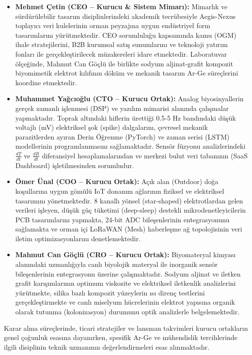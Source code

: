 \documentclass[11pt,a4paper]{article}
\begin{document}
\begin{itemize}[leftmargin=1cm]
  \item \textbf{Mehmet Çetin (CEO -- Kurucu \& Sistem Mimarı):} Mimarlık ve sürdürülebilir tasarım disiplinlerindeki akademik tecrübesiyle Aegis-Nexus toplayıcı veri kulelerinin orman peyzajına uygun endüstriyel form tasarımlarını yürütmektedir. CEO sorumluluğu kapsamında kamu (OGM) ihale stratejilerini, B2B kurumsal satış sunumlarını ve teknoloji yatırım fonları ile gerçekleştirilecek müzakereleri idare etmektedir. Laboratuvar ölçeğinde, Mahmut Can Göçlü ile birlikte sodyum aljinat-grafit kompozit biyomimetik elektrot kılıfının döküm ve mekanik tasarım Ar-Ge süreçlerini koordine etmektedir.
  \item \textbf{Muhammet Yağcıoğlu (CTO -- Kurucu Ortak):} Analog biyosinyallerin gerçek zamanlı işlenmesi (DSP) ve yazılım mimarisi alanında çalışmalar yapmaktadır. Toprak altındaki hiflerin ürettiği 0.5-5 Hz bandındaki düşük voltajlı (mV) elektriksel şok (spike) dalgalarını, çevresel mekanik parazitlerden ayıran Derin Öğrenme (PyTorch) ve zaman serisi (LSTM) modellerinin programlanmasını sağlamaktadır. Sensör füzyonu analizlerindeki $\frac{dT}{dt}$ ve $\frac{dR}{dt}$ diferansiyel hesaplamalarından ve merkezi bulut veri tabanının (SaaS Dashboard) işletilmesinden sorumludur.
  \item \textbf{Ömer Ünal (COO -- Kurucu Ortak):} Açık alan (Outdoor) doğa koşullarına uygun gömülü IoT donanım ağlarının fiziksel ve elektriksel tasarımını yönetmektedir. 8 kanallı yönsel (star-shaped) elektrotlardan gelen verileri işleyen, düşük güç tüketimi (deep-sleep) destekli mikrodenetleyicilerin PCB tasarımlarını yapmakta, 24-bit ADC bileşenlerinin entegrasyonunu sağlamakta ve orman içi LoRaWAN (Mesh) haberleşme ağ topolojisinin veri iletim optimizasyonlarını denetlemektedir.
  \item \textbf{Mahmut Can Göçlü (CRO -- Kurucu Ortak):} Biyomateryal kimyası alanındaki uzmanlığıyla canlı biyolojik materyal ile inorganik sensör bileşenlerinin entegrasyonu üzerine çalışmaktadır. Sodyum aljinat ve iletken grafit karışımlarının optimum viskozite ve elektriksel iletkenlik analizlerini yürütmekte, silika bazlı kompozit yüzeylerin ısı direnç testlerini gerçekleştirmekte ve canlı miselyum hücrelerinin elektrot yapısına organik olarak tutunma (kolonizasyon) durumunu optik analizlerle belgelemektedir.
\end{itemize}

Karar alma süreçlerinde, ticari stratejiler ve lansman takvimleri kurucu ortakların genel çoğunluk esasına dayanırken, spesifik Ar-Ge ve mühendislik tercihlerinde ilgili disiplinin teknik uzmanının değerlendirmeleri esas alınmaktadır.
\end{document}
